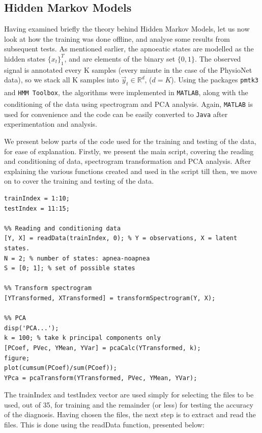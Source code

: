\subsection{Hidden Markov Models}
\label{sec:hmmExperiments-sachin}

Having examined briefly the theory behind Hidden Markov Models, let us now look at how the training was done offline, and analyse some results from subsequent tests. As mentioned earlier, the apnoeatic states are modelled as the hidden states $\{x_t\}_1^T$, and are elements of the binary set $\{0, 1\}$. The observed signal is annotated every K samples (every minute in the case of the PhysioNet data), so we stack all K samples into $\vec y_t \in \mathbb{R}^d$, ($d = K$). Using the packages \verb!pmtk3! and \verb!HMM Toolbox!, the algorithms were implemented in \verb!MATLAB!\textsuperscript{\textregistered}, along with the conditioning of the data using spectrogram and PCA analysis. Again, \verb!MATLAB!\textsuperscript{\textregistered} is used for convenience and the code can be easily converted to \verb!Java! after experimentation and analysis.

We present below parts of the code used for the training and testing of the data, for ease of explanation. Firstly, we present the main script, covering the reading and conditioning of data, spectrogram transformation and PCA analysis. After explaining the various functions created and used in the script till then, we move on to cover the training and testing of the data.

\begin{lstlisting}
trainIndex = 1:10;
testIndex = 11:15;

%% Reading and conditioning data
[Y, X] = readData(trainIndex, 0); % Y = observations, X = latent states.
N = 2; % number of states: apnea-noapnea
S = [0; 1]; % set of possible states

%% Transform spectrogram
[YTransformed, XTransformed] = transformSpectrogram(Y, X);

%% PCA
disp('PCA...');
k = 100; % take k principal components only
[PCoef, PVec, YMean, YVar] = pcaCalc(YTransformed, k);
figure;
plot(cumsum(PCoef)/sum(PCoef));
YPca = pcaTransform(YTransformed, PVec, YMean, YVar);
\end{lstlisting}

The trainIndex and testIndex vector are used simply for selecting the files to be used, out of 35, for training and the remainder (or less) for testing the accuracy of the diagnosis. Having chosen the files, the next step is to extract and read the files. This is done using the readData function, presented below:

